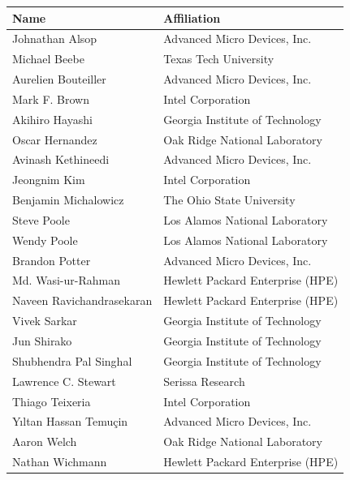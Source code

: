 \documentclass[10pt,oneside]{book}
\begin{document}
\begin{longtable}{p{}p{}}
\textbf{Name} & \textbf{Affiliation} \\
\hline
Johnathan Alsop & Advanced Micro Devices, Inc. \\
Michael Beebe & Texas Tech University \\
Aurelien Bouteiller & Advanced Micro Devices, Inc. \\
Mark F. Brown & Intel Corporation \\
Akihiro Hayashi & Georgia Institute of Technology \\
Oscar Hernandez & Oak Ridge National Laboratory \\
Avinash Kethineedi & Advanced Micro Devices, Inc. \\
Jeongnim Kim & Intel Corporation \\
Benjamin Michalowicz & The Ohio State University \\
Steve Poole & Los Alamos National Laboratory \\
Wendy Poole & Los Alamos National Laboratory \\
Brandon Potter & Advanced Micro Devices, Inc. \\
Md. Wasi-ur-Rahman & Hewlett Packard Enterprise (HPE) \\
Naveen Ravichandrasekaran & Hewlett Packard Enterprise (HPE) \\
Vivek Sarkar & Georgia Institute of Technology \\
Jun Shirako & Georgia Institute of Technology \\
Shubhendra Pal Singhal & Georgia Institute of Technology \\
Lawrence C. Stewart & Serissa Research \\
Thiago Teixeria & Intel Corporation \\
Y{\i}ltan Hassan Temu\c{c}in & Advanced Micro Devices, Inc. \\
Aaron Welch & Oak Ridge National Laboratory \\
Nathan Wichmann & Hewlett Packard Enterprise (HPE) \\
\end{longtable}

\pagebreak{}

\setcounter{tocdepth}{4}
\setcounter{secnumdepth}{4}
\tableofcontents

\mainmatter

\pagestyle{fancy}
\fancyhf{}
\fancyhead[L]{\leftmark}
\fancyhead[R]{\thepage}
\renewcommand{\headrulewidth}{0pt}
\renewcommand{\thesection}{\arabic{section}}
\end{document}
